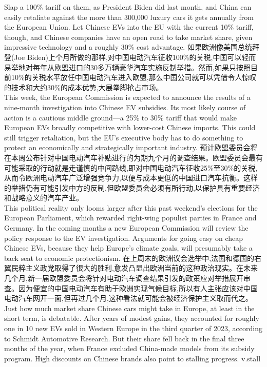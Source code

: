 \documentclass[a4paper,12pt]{article}
\begin{document}
Slap a 100\% tariff on them, as President Biden did last month, and China can easily retaliate against the more than 300,000 luxury cars it gets annually from the European Union. Let Chinese EVs into the EU with the current 10\% tariff, though, and Chinese companies have an open road to take market share, given impressive technology and a roughly 30\% cost advantage.
如果欧洲像美国总统拜登(Joe Biden)上个月所做的那样,对中国电动汽车征收100\%的关税,中国可以轻而易举地对每年从欧盟进口的30多万辆豪华汽车实施反制举措。然而,如果只按照目前10\%的关税水平放任中国电动汽车进入欧盟,那么中国公司就可以凭借令人惊叹的技术和大约30\%的成本优势,大展拳脚抢占市场。
\\This week, the European Commission is expected to announce the results of a nine-month investigation into Chinese EV subsidies. Its most likely course of action is a cautious middle ground—a 25\% to 30\% tariff that would make European EVs broadly competitive with lower-cost Chinese imports. This could still trigger retaliation, but the EU's executive body has to do something to protect an economically and strategically important industry.
预计欧盟委员会将在本周公布针对中国电动汽车补贴进行的为期九个月的调查结果。欧盟委员会最有可能采取的行动就是走谨慎的中间路线,即对中国电动汽车征收25\%至30\%的关税,从而令欧洲电动汽车广泛增强竞争力,以便与成本更低的中国进口汽车抗衡。这样的举措仍有可能引发中方的反制,但欧盟委员会必须有所行动,以保护具有重要经济和战略意义的汽车产业。
\\This political reality only looms larger after this past weekend's elections for the European Parliament, which rewarded right-wing populist parties in France and Germany. In the coming months a new European Commission will review the policy response to the EV investigation. Arguments for going easy on cheap Chinese EVs, because they help Europe's climate goals, will presumably take a back seat to economic protectionism.
在上周末的欧洲议会选举中,法国和德国的右翼民粹主义政党取得了很大的胜利,愈发凸显出欧洲当前的这种政治现实。在未来几个月,新一届欧盟委员会将针对电动汽车调查结果引发的政策应对举措展开审查。因为便宜的中国电动汽车有助于欧洲实现气候目标,所以有人主张应该对中国电动汽车网开一面,但再过几个月,这种看法就可能会被经济保护主义取而代之。
\\Just how much market share Chinese cars might take in Europe, at least in the short term, is debatable. After years of modest gains, they accounted for roughly one in 10 new EVs sold in Western Europe in the third quarter of 2023, according to Schmidt Automotive Research. But their share fell back in the final three months of the year, when France excluded China-made models from its subsidy program. High discounts on Chinese brands also point to stalling progress.   v.stall
\end{document}
